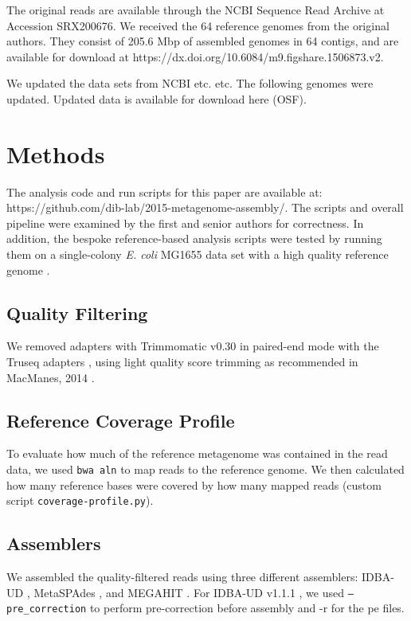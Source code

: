 \documentclass[10pt,a4paper,twocolumn]{article}
\begin{document}
The original reads are available through the NCBI Sequence Read
Archive at Accession SRX200676.
We received the 64 reference genomes from the original authors. They
consist of 205.6 Mbp of assembled genomes in 64 contigs, and are
available for download at
https://dx.doi.org/10.6084/m9.figshare.1506873.v2.

We updated the data sets from NCBI etc. etc.  The following genomes
were updated.  Updated data is available for download here (OSF).

\section*{Methods}
The analysis code and run scripts for this paper are available at:
https://github.com/dib-lab/2015-metagenome-assembly/. The scripts and
overall pipeline were examined by the first and senior authors for
correctness.  In addition, the bespoke reference-based analysis
scripts were tested by running them on a single-colony {\em E. coli} MG1655
data set with a high quality reference genome \cite{chitsaz2011}.

\subsection*{Quality Filtering} 

We removed adapters with Trimmomatic v0.30 in paired-end mode with the
Truseq adapters \cite{trimmomatic}, using light quality score trimming
as recommended in MacManes, 2014 \cite{macmanes2014optimal}.


\subsection*{Reference Coverage Profile}

To evaluate how much of the reference metagenome was contained in the read
data, we used {\tt bwa aln} to map reads to the reference genome.  We then
calculated how many reference bases were covered by how many mapped
reads (custom script {\tt coverage-profile.py}).

\subsection*{Assemblers}
We assembled the quality-filtered reads using three different assemblers: IDBA-UD
\cite{idba}, MetaSPAdes \cite{spades}, and MEGAHIT \cite{megahit}.  For
IDBA-UD v1.1.1 \cite{idba}, we used {\tt {--pre\_correction}} to
perform pre-correction before assembly and -r for the pe files.
\end{document}
